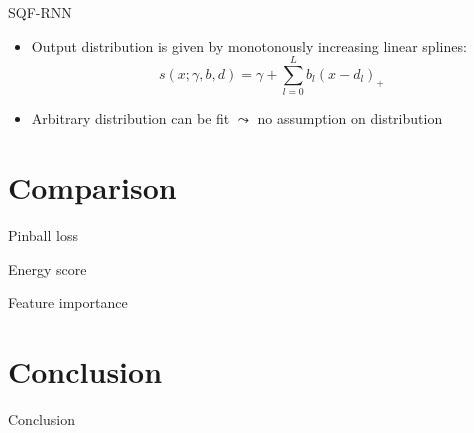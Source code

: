 \documentclass[10pt,aspectratio=169]{beamer}
\begin{document}
\begin{frame}{SQF-RNN}
    \begin{itemize}
        \item Output distribution is given by monotonously increasing linear splines: 
        \[ s(x; \gamma, b, d) = \gamma + \sum_{l=0}^L b_l (x - d_l)_+ \]
        \item Arbitrary distribution can be fit \(\leadsto\) no assumption on distribution
    \end{itemize}
\end{frame}

\section{Comparison}

\begin{frame}{Pinball loss}
    
\end{frame}

\begin{frame}{Energy score}
    
\end{frame}

\begin{frame}{Feature importance}
    
\end{frame}

\section{Conclusion}

\begin{frame}{Conclusion}
    
\end{frame}
\end{document}
